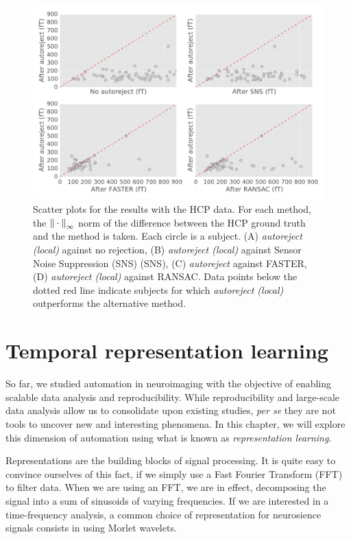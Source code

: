 \begin{figure}[htb!]
    \centering
    \includegraphics[width=\linewidth]{figures/figure4.pdf}
    \caption[]{Scatter plots for the results with the HCP data. For each method, the ${\| \cdot \|}_{\mathrm{\infty}}$ norm of the difference between the HCP ground truth and the method is taken. Each circle is a subject. (A) \textit{autoreject (local)} against no rejection, (B) \textit{autoreject (local)} against Sensor Noise Suppression (SNS) (SNS), (C) \textit{autoreject} against FASTER, (D) \textit{autoreject (local)} against RANSAC. Data points below the dotted red line indicate subjects for which \textit{autoreject (local)} outperforms the alternative method.}
    \label{fig:sommaire:hcp_scatter}
\end{figure}

\clearpage
\section*{Temporal representation learning}

So far, we studied automation in neuroimaging with the objective of enabling scalable data analysis and reproducibility. While  reproducibility and large-scale data analysis allow us to consolidate upon existing studies, \emph{per se} they are not tools to uncover new and interesting phenomena. In this chapter, we will explore this dimension of automation using what is known as \emph{representation learning}.

Representations are the building blocks of signal processing. It is quite easy to convince ourselves of this fact, if we simply use a Fast Fourier Transform (FFT) to filter data. When we are using an FFT, we are in effect, decomposing the signal into a sum of sinusoids of varying frequencies. If we are interested in a time-frequency analysis, a common choice of representation for neurosience signals consists in using Morlet wavelets.

